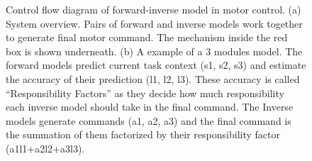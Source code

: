 \begin{figure}
  \centering
      \vspace{0.5cm}
%
  \caption{ \scriptsize{Control flow diagram of forward-inverse model in motor control. (a) System overview. Pairs of forward and inverse models work together to generate final motor command. The mechanism inside the red box is shown underneath. (b) A example of a 3 modules model. The forward models predict current task context (s1, s2, s3) and estimate the accuracy of their prediction (l1, l2, l3). These accuracy is called ``Responsibility Factors'' as they decide how much responsibility each inverse model should take in the final command. The Inverse models generate commands (a1, a2, a3) and the final command is the summation of them factorized by their responsibility factor (a1l1+a2l2+a3l3).  }
}
\label{fig:control}
\end{figure}



